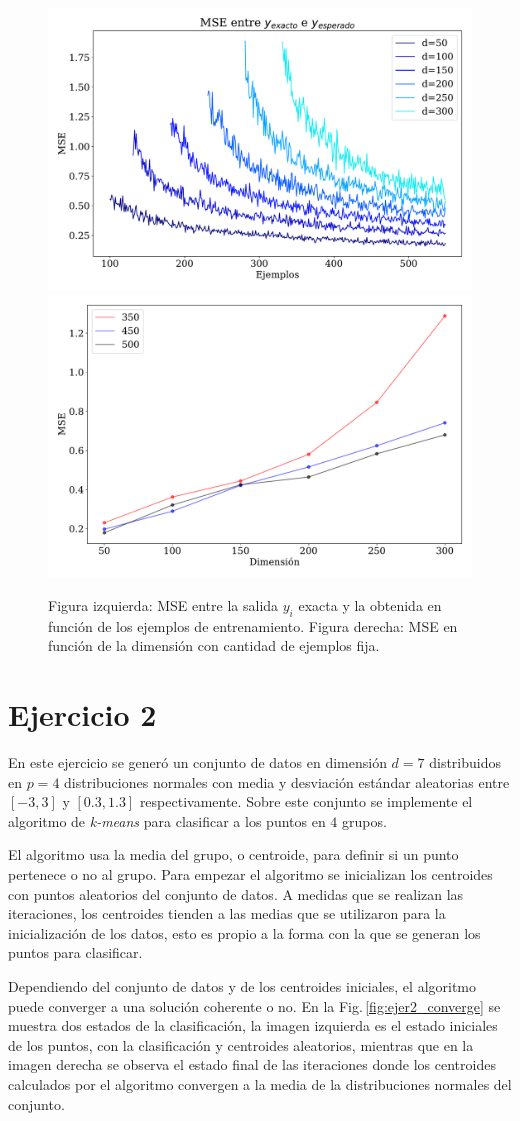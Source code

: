     \begin{figure}[H]
        \centering
        \includegraphics[width=0.5\linewidth]{plots/ejer_1_mse_y_ejemplos.pdf}%
        \hfill
        \includegraphics[width=0.5\linewidth]{plots/ejer_1_mse_y_ejemplos_fijo.pdf}
        \caption{Figura izquierda: MSE entre la salida $y_i$ exacta y la obtenida en función de los ejemplos de entrenamiento. Figura derecha: MSE en función de la dimensión con cantidad de ejemplos fija.}
        \label{fig:ejer1_y_ejemplos}
    \end{figure}

    \section*{Ejercicio 2}

    En este ejercicio se generó un conjunto de datos en dimensión $d=7$ distribuidos en $p=4$ distribuciones normales con media y desviación estándar aleatorias entre $[-3, 3]$ y $[0.3,1.3]$ respectivamente.   Sobre este conjunto se implemente el algoritmo de \emph{k-means} para clasificar a los puntos en $4$ grupos.
    
    El algoritmo usa la media del grupo, o centroide, para definir si un punto pertenece o no al grupo. Para empezar el algoritmo se inicializan los centroides con puntos aleatorios del conjunto de datos.  A medidas que se realizan las iteraciones, los centroides tienden a las medias que se utilizaron para la inicialización de los datos, esto es propio a la forma con la que se generan los puntos para clasificar.

    Dependiendo del conjunto de datos y de los centroides iniciales, el algoritmo puede converger a una solución coherente o no. En  la Fig.\,\ref{fig:ejer2_converge} se muestra dos estados de la clasificación, la imagen izquierda es el estado iniciales de los puntos, con la clasificación y centroides aleatorios, mientras que en la imagen derecha se observa el estado final de las iteraciones donde los centroides calculados por el algoritmo convergen a la media de la distribuciones normales del conjunto.

